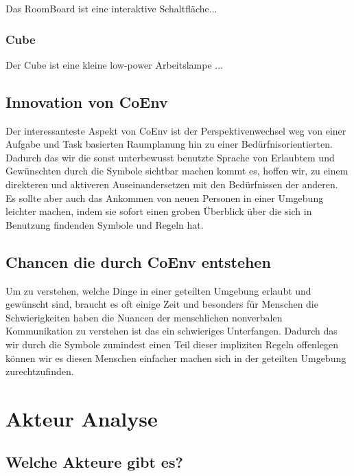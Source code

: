 \documentclass{article}
\begin{document}
Das RoomBoard ist eine interaktive Schaltfläche...

\subsubsection*{Cube}

Der Cube ist eine kleine low-power Arbeitslampe ...

\subsection{Innovation von CoEnv}

Der interessanteste Aspekt von CoEnv ist der Perspektivenwechsel weg von einer Aufgabe und Task basierten Raumplanung hin zu einer Bedürfnisorientierten. Dadurch das wir die sonst unterbewusst benutzte Sprache von Erlaubtem und Gewünschten durch die Symbole sichtbar machen kommt es, hoffen wir, zu einem direkteren und aktiveren Auseinandersetzen mit den Bedürfnissen der anderen. Es sollte aber auch das Ankommen von neuen Personen in einer Umgebung leichter machen, indem sie sofort einen groben Überblick über die sich in Benutzung findenden Symbole und Regeln hat.


\subsection{Chancen die durch CoEnv entstehen}

Um zu verstehen, welche Dinge in einer geteilten Umgebung erlaubt und gewünscht sind, braucht es oft einige Zeit und besonders für Menschen die Schwierigkeiten haben die Nuancen der menschlichen nonverbalen Kommunikation zu verstehen ist das ein schwieriges Unterfangen. Dadurch das wir durch die Symbole zumindest einen Teil dieser impliziten Regeln offenlegen können wir es diesen Menschen einfacher machen sich in der geteilten Umgebung zurechtzufinden.


\section{Akteur Analyse}

\subsection{Welche Akteure gibt es?}
\end{document}
